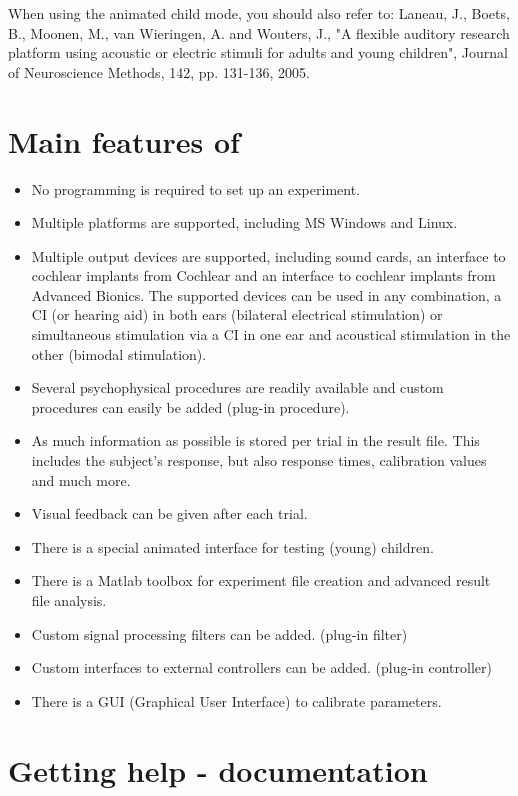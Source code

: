 When using the animated child mode, you should also refer to:
Laneau, J., Boets, B., Moonen, M., van Wieringen, A. and Wouters,
J., "A flexible auditory research platform using acoustic or
electric stimuli for adults and young children", Journal of
Neuroscience Methods, 142, pp. 131-136, 2005.

\section {Main features of \apex}
\begin{itemize}
\item No programming is required to set up an experiment. 
\item
Multiple platforms are supported, including MS Windows and Linux.
\item Multiple output devices are supported, including sound
cards, an interface to cochlear implants from Cochlear and an
interface to cochlear implants from Advanced  Bionics. The
supported devices can be used in any combination, a CI (or hearing
aid) in both ears (bilateral electrical stimulation) or
simultaneous stimulation via a CI in one ear and acoustical
stimulation in the other (bimodal stimulation). 
\item Several
psychophysical procedures are readily available and custom
procedures can easily be added (plug-in procedure). 
\item As much
information as possible is stored per trial in the result file.
This includes the subject's response, but also response times,
calibration values and much more. 
\item Visual feedback
can be given after each trial. 
\item There is a special animated
interface for testing (young) children. 
\item There is a Matlab
toolbox for experiment file creation and advanced result file
analysis. 
\item Custom signal processing filters can be added.
(plug-in filter) 
\item Custom interfaces to external controllers
can be added. (plug-in controller) 
\item There is a {GUI}
(Graphical User Interface) to calibrate parameters.
\end{itemize}

\section{Getting help - documentation}

